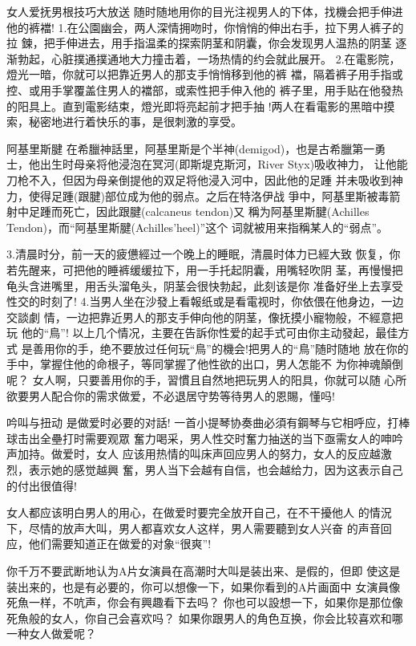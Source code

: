 \documentclass[12pt,UTF8]{ctexbook}
\begin{document}
女人爱抚男根技巧大放送
随时随地用你的目光注视男人的下体，找機会把手伸进他的裤襠!
1.在公園幽会，两人深情拥吻时，你悄悄的伸出右手，拉下男人裤子的拉
鍊，把手伸进去，用手指温柔的探索阴茎和阴囊，你会发现男人温热的阴茎
逐渐勃起，心脏撲通撲通地大力撞击着，一场热情的约会就此展开。
2.在電影院，燈光一暗，你就可以把靠近男人的那支手悄悄移到他的裤
襠，隔着裤子用手指或控、或用手掌覆盖住男人的襠部，或索性把手伸入他的
裤子里，用手贴在他發热的阳具上。直到電影结束，燈光即将亮起前才把手抽
!两人在看電影的黑暗中摸索，秘密地进行着快乐的事，是很刺激的享受。

阿基里斯腱
在希臘神話里，阿基里斯是个半神(demigod)，也是古希臘第一勇
士，他出生时母亲将他浸泡在冥河(即斯堤克斯河，River Styx)吸收神力，
让他能刀枪不入，但因为母亲倒提他的双足将他浸入河中，因此他的足踵
并未吸收到神力，使得足踵(跟腱)部位成为他的弱点。之后在特洛伊战
爭中，阿基里斯被毒箭射中足踵而死亡，因此跟腱(calcaneus tendon)又
稱为阿基里斯腱(Achilles Tendon)，而“阿基里斯腱(Achilles'heel)”这个
词就被用来指稱某人的“弱点”。

3.清晨时分，前一天的疲憊經过一个晚上的睡眠，清晨时体力已經大致
恢复，你若先醒来，可把他的睡裤缓缓拉下，用一手托起阴囊，用嘴轻吹阴
茎，再慢慢把龟头含进嘴里，用舌头溜龟头，阴茎会很快勃起，此刻该是你
准备好坐上去享受性交的时刻了!
4.当男人坐在沙發上看報纸或是看電视时，你依偎在他身边，一边交談劇
情，一边把靠近男人的那支手伸向他的阴茎，像抚摸小寵物般，不經意把玩
他的“鳥”!
以上几个情况，主要在告訴你性爱的起手式可由你主动發起，最佳方式
是善用你的手，绝不要放过任何玩“鳥”的機会!把男人的“鳥”随时随地
放在你的手中，掌握住他的命根子，等同掌握了他性欲的出口，男人怎能不
为你神魂顛倒呢？
女人啊，只要善用你的手，習慣且自然地把玩男人的阳具，你就可以随
心所欲要男人配合你的需求做爱，不必退居守势等待男人的恩賜，懂吗!

吟叫与扭动
是做爱时必要的对話!
一首小提琴协奏曲必須有鋼琴与它相呼应，打棒球击出全壘打时需要观眾
奮力喝采，男人性交时奮力抽送的当下亟需女人的呻吟声加持。做爱时，女人
应该用热情的叫床声回应男人的努力，女人的反应越激烈，表示她的感觉越興
奮，男人当下会越有自信，也会越给力，因为这表示自己的付出很值得!

女人都应该明白男人的用心，在做爱时要完全放开自己，在不干擾他人
的情況下，尽情的放声大叫，男人都喜欢女人这样，男人需要聽到女人兴奋
的声音回应，他们需要知道正在做爱的对象“很爽”!

你千万不要武断地认为A片女演員在高潮时大叫是装出来、是假的，但即
使这是装出来的，也是有必要的，你可以想像一下，如果你看到的A片画面中
女演員像死魚一样，不吭声，你会有興趣看下去吗？
你也可以設想一下，如果你是那位像死魚般的女人，你自己会喜欢吗？
如果你跟男人的角色互换，你会比较喜欢和哪一种女人做爱呢？
\end{document}
